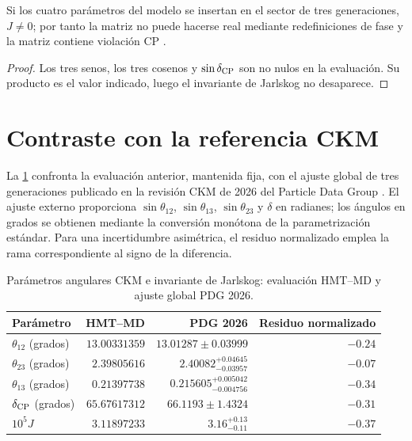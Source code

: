 \begin{theorem}
Si los cuatro parámetros del modelo se insertan en el sector de tres
generaciones, \(J\ne0\); por tanto la matriz no puede hacerse real mediante
redefiniciones de fase y la matriz contiene violación CP
\cite{Cabibbo1963,KobayashiMaskawa1973,Jarlskog1985}.
\end{theorem}
\begin{proof}
Los tres senos, los tres cosenos y \(\sin\delta_{\rm CP}\) son no nulos en la
evaluación. Su producto es el valor indicado, luego el invariante de Jarlskog
no desaparece.
\end{proof}

\section{Contraste con la referencia CKM}
\label{sec:comparacion-ckm-pdg-2026}

La \cref{tab:comparacion-angular-ckm-pdg-2026} confronta la evaluación
anterior, mantenida fija, con el ajuste global de tres generaciones publicado
en la revisión CKM de 2026 del Particle Data Group
\cite{PDGCKM2026}. El ajuste externo proporciona
\(\sin\theta_{12}\), \(\sin\theta_{13}\), \(\sin\theta_{23}\) y
\(\delta\) en radianes; los ángulos en grados se obtienen mediante la
conversión monótona de la parametrización estándar. Para una incertidumbre
asimétrica, el residuo normalizado emplea la rama correspondiente al signo de
la diferencia.

\begin{table}[htbp]
\centering
\caption{Parámetros angulares CKM e invariante de Jarlskog: evaluación
HMT--MD y ajuste global PDG 2026.}
\label{tab:comparacion-angular-ckm-pdg-2026}
\small
\begin{tabular}{@{}lrrr@{}}
\toprule
Parámetro & HMT--MD & PDG 2026 & Residuo normalizado\\
\midrule
\(\theta_{12}\) (grados) &
\(13.00331359\) & \(13.01287\pm0.03999\) & \(-0.24\)\\
\(\theta_{23}\) (grados) &
\(2.39805616\) & \(2.40082^{+0.04645}_{-0.03957}\) & \(-0.07\)\\
\(\theta_{13}\) (grados) &
\(0.21397738\) & \(0.215605^{+0.005042}_{-0.004756}\) & \(-0.34\)\\
\(\delta_{\rm CP}\) (grados) &
\(65.67617312\) & \(66.1193\pm1.4324\) & \(-0.31\)\\
\(10^5J\) &
\(3.11897233\) & \(3.16^{+0.13}_{-0.11}\) & \(-0.37\)\\
\bottomrule
\end{tabular}
\end{table}

